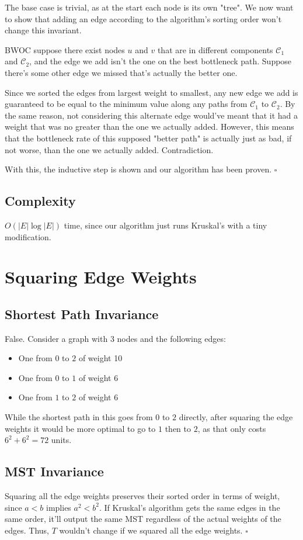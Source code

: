 \documentclass[12pt]{article}
\begin{document}
The base case is trivial, as at the start each node is its own "tree".
We now want to show that adding an edge according to the algorithm's
sorting order won't change this invariant.

BWOC suppose there exist nodes $u$ and $v$ that are in different components
$\mathcal{C}_1$ and $\mathcal{C}_2$, and the edge we add isn't the one on the best bottleneck path.
Suppose there's some other edge we missed that's actually the better one.

Since we sorted the edges from largest weight to smallest, any new edge we add
is guaranteed to be equal to the minimum value along any paths from $\mathcal{C}_1$ to $\mathcal{C}_2$.
By the same reason, not considering this alternate edge would've meant that
it had a weight that was no greater than the one we actually added.
However, this means that the bottleneck rate of this supposed "better path"
is actually just as bad, if not worse, than the one we actually added.
Contradiction.

With this, the inductive step is shown and our algorithm has been proven. $\square$

\subsection{Complexity}

$\boxed{O(|E| \log |E|)}$ time, since our algorithm just runs Kruskal's with a tiny modification.

\pagebreak

\section{Squaring Edge Weights}

\subsection{Shortest Path Invariance}

False. Consider a graph with 3 nodes and the following edges:
\begin{itemize}[nolistsep]
    \item One from $0$ to $2$ of weight 10
    \item One from $0$ to $1$ of weight 6
    \item One from $1$ to $2$ of weight 6
\end{itemize}
While the shortest path in this goes from $0$ to $2$ directly,
after squaring the edge weights it would be more optimal
to go to $1$ then to $2$, as that only costs $6^2+6^2=72$ units.

\subsection{MST Invariance}

Squaring all the edge weights preserves their sorted order in terms
of weight, since $a < b$ implies $a^2 < b^2$.
If Kruskal's algorithm gets the same edges in the same order,
it'll output the same MST regardless of the actual weights of the edges.
Thus, $T$ wouldn't change if we squared all the edge weights. $\square$
\end{document}
